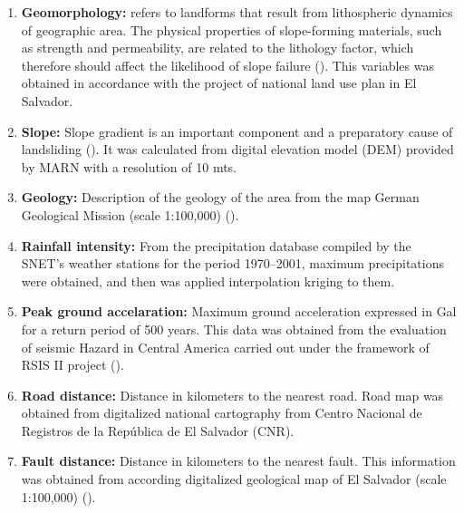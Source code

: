 \documentclass[11pt,twoside]{rmta2010esp}%
\begin{document}
\begin{enumerate}
\item {\bf Geomorphology:} refers to landforms that result from lithospheric dynamics of geographic area. The physical properties of slope-forming materials, such as strength and permeability, are related to the lithology factor, which therefore should affect the likelihood of slope failure (\cite{dai2002}). This variables was obtained in accordance with the project of national land use plan in El Salvador.

\item {\bf Slope:} Slope gradient is an important component and a
preparatory cause of landsliding (\cite{garcia2008}). It was calculated from digital elevation model (DEM) provided by MARN with a resolution of 10 mts. 

\item {\bf Geology:} Description of the geology of the area from the map German Geological Mission (scale 1:100,000) (\cite{weber}).

\item {\bf Rainfall intensity:} From the precipitation database compiled by the
SNET's weather stations for the period 1970–2001, maximum precipitations were obtained, and then was applied interpolation kriging to them.

\item {\bf Peak ground accelaration:} Maximum ground acceleration expressed in Gal for a return period of 500 years. This data was obtained from the evaluation of seismic Hazard in Central America carried out under the framework of RSIS II project (\cite{beni2012}).

\item {\bf Road distance:} Distance in kilometers to the nearest road. Road map was obtained from digitalized national cartography from Centro Nacional de Registros de la República de El Salvador (CNR).

\item {\bf Fault distance:} Distance in kilometers to the nearest fault. This information was obtained from according digitalized geological map of El Salvador (scale 1:100,000) (\cite{weber}).
 
\end{enumerate}


\end{document}
